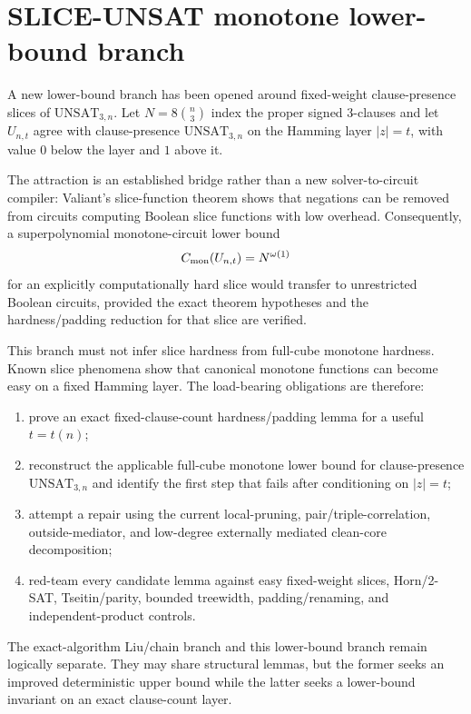 \documentclass[11pt]{article}
\begin{document}
\section{SLICE-UNSAT monotone lower-bound branch}

A new lower-bound branch has been opened around fixed-weight clause-presence slices of
\(\mathrm{UNSAT}_{3,n}\). Let \(N=8\binom n3\) index the proper signed 3-clauses and let
\(U_{n,t}\) agree with clause-presence \(\mathrm{UNSAT}_{3,n}\) on the Hamming layer
\(|z|=t\), with value \(0\) below the layer and \(1\) above it.

The attraction is an established bridge rather than a new solver-to-circuit compiler:
Valiant's slice-function theorem shows that negations can be removed from circuits computing
Boolean slice functions with low overhead. Consequently, a superpolynomial monotone-circuit
lower bound
\[
C_{\rm mon}(U_{n,t})=N^{\omega(1)}
\]
for an explicitly computationally hard slice would transfer to unrestricted Boolean circuits,
provided the exact theorem hypotheses and the hardness/padding reduction for that slice are
verified.

This branch must not infer slice hardness from full-cube monotone hardness. Known slice
phenomena show that canonical monotone functions can become easy on a fixed Hamming layer.
The load-bearing obligations are therefore:
\begin{enumerate}
\item prove an exact fixed-clause-count hardness/padding lemma for a useful \(t=t(n)\);
\item reconstruct the applicable full-cube monotone lower bound for clause-presence
\(\mathrm{UNSAT}_{3,n}\) and identify the first step that fails after conditioning on \(|z|=t\);
\item attempt a repair using the current local-pruning, pair/triple-correlation,
outside-mediator, and low-degree externally mediated clean-core decomposition;
\item red-team every candidate lemma against easy fixed-weight slices, Horn/2-SAT,
Tseitin/parity, bounded treewidth, padding/renaming, and independent-product controls.
\end{enumerate}

The exact-algorithm Liu/chain branch and this lower-bound branch remain logically separate.
They may share structural lemmas, but the former seeks an improved deterministic upper bound
while the latter seeks a lower-bound invariant on an exact clause-count layer.
\end{document}
